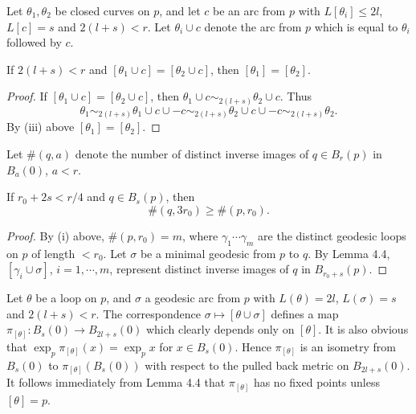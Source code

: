 Let $\theta_1,\theta_2$ be closed curves on $p$, and let $c$ be an arc from $p$
with $L[\theta_i]\le 2l$, $L[c]=s$ and $2(l+s)<r$. Let $\theta_i \cup c$ denote
the arc from $p$ which is equal to $\theta_i$ followed by $c$.

\begin{lemma}
\label{lem:radial-class-concatenation}

If $2(l+s)<r$ and $[\theta_1\cup c]=[\theta_2\cup c]$, then $[\theta_1]=[\theta_2]$.
\end{lemma}

\begin{proof}
If $[\theta_1\cup c]=[\theta_2\cup c]$, then $\theta_1\cup c \sim_{2(l+s)}
\theta_2\cup c$. Thus
\[
\theta_1 \sim_{2(l+s)} \theta_1\cup c\cup -c \sim_{2(l+s)}
\theta_2\cup c\cup -c \sim_{2(l+s)} \theta_2.
\]
By (iii) above $[\theta_1]=[\theta_2]$.
\end{proof}

Let $\#(q,a)$ denote the number of distinct inverse images of $q \in B_r(p)$ in
$B_a(0)$, $a < r$.

\begin{lemma}
\label{lem:even-covering}

If $r_0 + 2s < r/4$ and $q \in B_s(p)$, then
\[
\#(q,3r_0) \ge \#(p,r_0).
\]
\end{lemma}

\begin{proof}
By (i) above, $\#(p,r_0)=m$, where $\gamma_1 \cdots \gamma_m$ are the distinct
geodesic loops on $p$ of length $< r_0$. Let $\sigma$ be a minimal geodesic from
$p$ to $q$. By Lemma 4.4, $[\gamma_i \cup \sigma]$, $i=1,\cdots,m$, represent
distinct inverse images of $q$ in $B_{r_0+s}(p)$.
\end{proof}

Let $\theta$ be a loop on $p$, and $\sigma$ a geodesic arc from $p$ with
$L(\theta)=2l$, $L(\sigma)=s$ and $2(l+s)<r$. The correspondence
$\sigma \mapsto [\theta \cup \sigma]$ defines a map $\pi_{[\theta]}: B_s(0) \to
B_{2l+s}(0)$ which clearly depends only on $[\theta]$. It is also obvious that
$\exp_p \pi_{[\theta]}(x)=\exp_p x$ for $x \in B_s(0)$. Hence $\pi_{[\theta]}$ is
an isometry from $B_s(0)$ to $\pi_{[\theta]}(B_s(0))$ with respect to the pulled
back metric on $B_{2l+s}(0)$. It follows immediately from Lemma 4.4 that
$\pi_{[\theta]}$ has no fixed points unless $[\theta]=p$.

